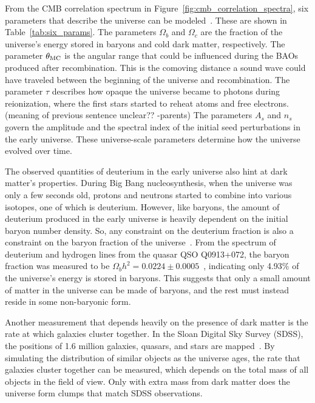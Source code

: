 From the CMB correlation spectrum in Figure~\ref{fig:cmb_correlation_spectra}, six parameters that describe the universe can be modeled~\cite{planck_dm_limit,planck_2013_parameters}.
These are shown in Table~\ref{tab:six_params}.
The parameters $\Omega_b$ and $\Omega_c$ are the fraction of the universe's energy stored in baryons and cold dark matter, respectively.
The parameter $\theta_{\textrm{MC}}$ is the angular range that could be influenced during the BAOs produced after recombination.
This is the comoving distance a sound wave could have traveled between the beginning of the universe and recombination.
The parameter $\tau$ describes how opaque the universe became to photons during reionization, where the first stars started to reheat atoms and free electrons.
{\color{red}(meaning of previous sentence unclear?? -parents)}
The parameters $A_s$ and $n_s$ govern the amplitude and the spectral index of the initial seed perturbations in the early universe.
These universe-scale parameters determine how the universe evolved over time.

The observed quantities of deuterium in the early universe also hint at dark matter's properties.
During Big Bang nucleosynthesis, when the universe was only a few seconds old, protons and neutrons started to combine into various isotopes, one of which is deuterium.
However, like baryons, the amount of deuterium produced in the early universe is heavily dependent on the initial baryon number density.
So, any constraint on the deuterium fraction is also a constraint on the baryon fraction of the universe~\cite{deuterium1,deuterium2}.
From the spectrum of deuterium and hydrogen lines from the quasar QSO Q0913+072, the baryon fraction was measured to be $\Omega_{b}h^2 = 0.0224 \pm 0.0005$~\cite{deuterium3}, indicating only 4.93\% of the universe's energy is stored in baryons.
This suggests that only a small amount of matter in the universe can be made of baryons, and the rest must instead reside in some non-baryonic form.

Another measurement that depends heavily on the presence of dark matter is the rate at which galaxies cluster together.
In the Sloan Digital Sky Survey (SDSS), the positions of 1.6 million galaxies, quasars, and stars are mapped~\cite{sdss_release}.
By simulating the distribution of similar objects as the universe ages, the rate that galaxies cluster together can be measured, which depends on the total mass of all objects in the field of view.
Only with extra mass from dark matter does the universe form clumps that match SDSS observations.

